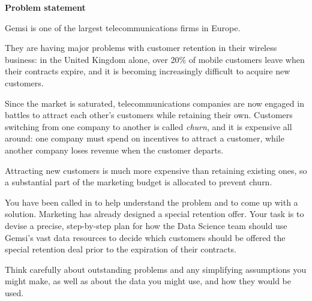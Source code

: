 \documentclass[a4paper,oneside,12pt]{article}
\begin{document}
\begin{center}
    {\LARGE\textbf{%
     Problem statement}}
\end{center}

Gemsi is one of the largest telecommunications firms in Europe.

They are having major problems with customer retention in their wireless
business: in the United Kingdom alone, over 20\% of mobile customers leave when
their contracts expire, and it is becoming increasingly difficult to acquire new
customers.

Since the market is saturated, telecommunications companies are now engaged in
battles to attract each other's customers while retaining their own.
%
Customers switching from one company to another is called \emph{churn}, and it
is expensive all around: one company must spend on incentives to attract a
customer, while another company loses revenue when the customer departs.

Attracting new customers is much more expensive than retaining existing ones, so
a substantial part of the marketing budget is allocated to prevent churn.

You have been called in to help understand the problem and to come up with a
solution.
%
Marketing has already designed a special retention offer.
%
Your task is to devise a precise, step\hyp{}by\hyp{}step plan for how the Data
Science team should use Gemsi's vast data resources to decide which customers
should be offered the special retention deal prior to the expiration of their
contracts.

Think carefully about outstanding problems and any simplifying assumptions you
might make, as well as about the data you might use, and how they would be used.
\end{document}
